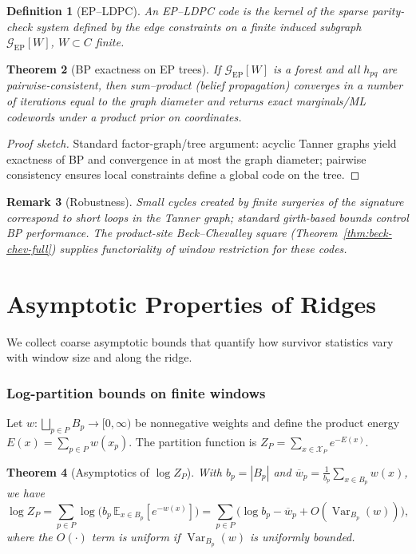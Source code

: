 \documentclass[12pt]{article}
\newtheorem{theorem}{Theorem}[section]
\newtheorem{definition}[theorem]{Definition}
\newtheorem{remark}[theorem]{Remark}
\numberwithin{equation}{section}
\begin{document}
\begin{definition}[EP–LDPC]
An \emph{EP–LDPC} code is the kernel of the sparse parity-check system defined by the edge constraints on a finite induced subgraph $\mathcal{G}_{\!\mathrm{EP}}[W]$, $W\subset C$ finite.
\end{definition}

\begin{theorem}[BP exactness on EP trees]
If $\mathcal{G}_{\!\mathrm{EP}}[W]$ is a forest and all $h_{pq}$ are pairwise-consistent, then sum–product (belief propagation) converges in a number of iterations equal to the graph diameter and returns exact marginals/ML codewords under a product prior on coordinates.
\end{theorem}

\begin{proof}[Proof sketch]
Standard factor-graph/tree argument: acyclic Tanner graphs yield exactness of BP and convergence in at most the graph diameter; pairwise consistency ensures local constraints define a global code on the tree.
\end{proof}

\begin{remark}[Robustness]
Small cycles created by finite surgeries of the signature correspond to short loops in the Tanner graph; standard girth-based bounds control BP performance. The product-site Beck–Chevalley square (Theorem~\ref{thm:beck-chev-full}) supplies functoriality of window restriction for these codes.
\end{remark}

\section{Asymptotic Properties of Ridges}\label{sec:asymptotics}
We collect coarse asymptotic bounds that quantify how survivor statistics vary with window size and along the ridge.

\subsubsection{Log-partition bounds on finite windows}\label{subsec:C5-logZ}
Let $w: \bigsqcup_{p\in P} B_p \to [0,\infty)$ be nonnegative weights and define the product energy $E(x)=\sum_{p\in P} w(x_p)$. The partition function is $Z_P=\sum_{x\in\mathscr{X}_P} e^{-E(x)}$.

\begin{theorem}[Asymptotics of $\log Z_P$]
With $b_p=|B_p|$ and $\overline{w}_p=\frac{1}{b_p}\sum_{x\in B_p} w(x)$, we have
\[
\log Z_P = \sum_{p\in P} \log\Big(b_p\, \mathbb{E}_{x\in B_p}[e^{-w(x)}]\Big)
= \sum_{p\in P} \big( \log b_p - \overline{w}_p + O(\operatorname{Var}_{B_p}(w))\big),
\]
where the $O(\cdot)$ term is uniform if $\operatorname{Var}_{B_p}(w)$ is uniformly bounded.
\end{theorem}
\end{document}
